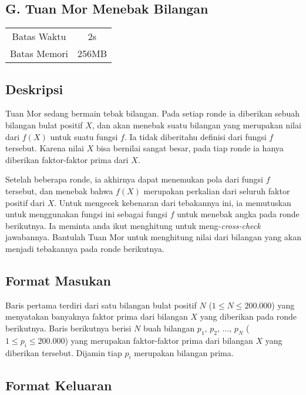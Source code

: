 \documentclass{article}
\begin{document}
\begin{center}
    \section*{G. Tuan Mor Menebak Bilangan}

    \begin{tabular}{ | c c | }
        \hline
        Batas Waktu  & 2s \\ 
        Batas Memori & 256MB \\ 
        \hline
    \end{tabular}
\end{center}

\subsection*{Deskripsi}

Tuan Mor sedang bermain tebak bilangan. Pada setiap ronde ia diberikan sebuah bilangan bulat positif $X$, dan akan menebak suatu bilangan yang merupakan nilai dari $f(X)$ untuk suatu fungsi $f$. Ia tidak diberitahu definisi dari fungsi $f$ tersebut. Karena nilai $X$ bisa bernilai sangat besar, pada tiap ronde ia hanya diberikan faktor-faktor prima dari $X$. 

Setelah beberapa ronde, ia akhirnya dapat menemukan pola dari fungsi $f$ tersebut, dan menebak bahwa $f(X)$ merupakan perkalian dari seluruh faktor positif dari $X$. Untuk mengecek kebenaran dari tebakannya ini, ia memutuskan untuk menggunakan fungsi ini sebagai fungsi $f$ untuk menebak angka pada ronde berikutnya. Ia meminta anda ikut menghitung untuk meng-\textit{cross-check} jawabannya. Bantulah Tuan Mor untuk menghitung nilai dari bilangan yang akan menjadi tebakannya pada ronde berikutnya.

\subsection*{Format Masukan}

Baris pertama terdiri dari satu bilangan bulat positif $N$ ($1 \leq N \leq 200.000$) yang menyatakan banyaknya faktor prima dari bilangan $X$ yang diberikan pada ronde berikutnya.
Baris berikutnya berisi $N$ buah bilangan $p_1$, $p_2$, $\dots$, $p_N$ ($1 \leq p_i \leq 200.000$) yang merupakan faktor-faktor prima dari bilangan $X$ yang diberikan tersebut. Dijamin tiap $p_i$ merupakan bilangan prima.

\subsection*{Format Keluaran}
\end{document}
